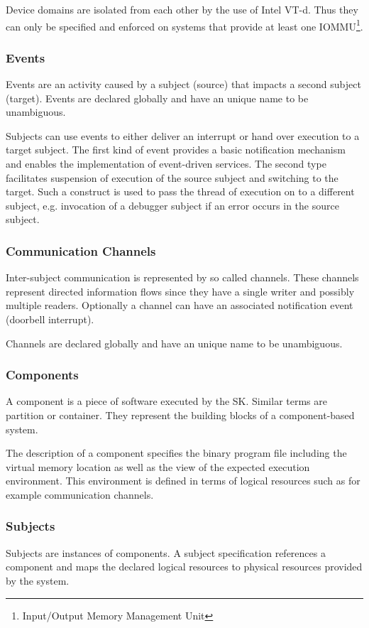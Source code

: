 \documentclass[a4paper,twoside,titlepage]{article}
\begin{document}
Device domains are isolated from each other by the use of Intel VT-d. Thus they
can only be specified and enforced on systems that provide at least one
IOMMU\footnote{Input/Output Memory Management Unit}.

\subsubsection{Events}
Events are an activity caused by a subject (source) that impacts a second
subject (target). Events are declared globally and have an unique name to be
unambiguous.

Subjects can use events to either deliver an interrupt or hand over execution to
a target subject. The first kind of event provides a basic notification
mechanism and enables the implementation of event-driven services. The second
type facilitates suspension of execution of the source subject and switching to
the target. Such a construct is used to pass the thread of execution on to a
different subject, e.g. invocation of a debugger subject if an error occurs in
the source subject.

\subsubsection{Communication Channels}
Inter-subject communication is represented by so called channels. These channels
represent directed information flows since they have a single writer and
possibly multiple readers. Optionally a channel can have an associated
notification event (doorbell interrupt).

Channels are declared globally and have an unique name to be unambiguous.

\subsubsection{Components}
A component is a piece of software executed by the SK. Similar terms are
partition or container. They represent the building blocks of a component-based
system.

The description of a component specifies the binary program file including the
virtual memory location as well as the view of the expected execution
environment. This environment is defined in terms of logical resources such as
for example communication channels.

\subsubsection{Subjects}
Subjects are instances of components. A subject specification references a
component and maps the declared logical resources to physical resources provided
by the system.
\end{document}
